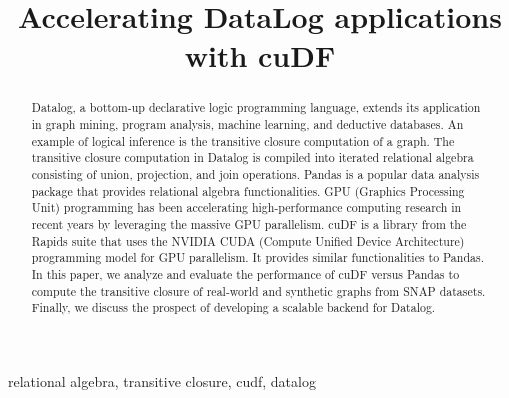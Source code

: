 \documentclass[conference]{IEEEtran}
\begin{document}
\title{Accelerating DataLog applications with cuDF \\
}

\author{
	}


\maketitle

\begin{abstract}
Datalog, a bottom-up declarative logic programming language, extends its application in graph mining, program analysis, machine learning, and deductive databases. An example of logical inference is the transitive closure computation of a graph. The transitive closure computation in Datalog is compiled into iterated relational algebra consisting of union, projection, and join operations. Pandas is a popular data analysis package that provides relational algebra functionalities. GPU (Graphics Processing Unit) programming has been accelerating high-performance computing research in recent years by leveraging the massive GPU parallelism. cuDF is a library from the Rapids suite that uses the NVIDIA CUDA (Compute Unified Device Architecture) programming model for GPU parallelism. It provides similar functionalities to Pandas. In this paper, we analyze and evaluate the performance of cuDF versus Pandas to compute the transitive closure of real-world and synthetic graphs from SNAP datasets. Finally, we discuss the prospect of developing a scalable backend for Datalog. 
\end{abstract}

\begin{IEEEkeywords}
relational algebra, transitive closure, cudf, datalog
\end{IEEEkeywords}









\end{document}
